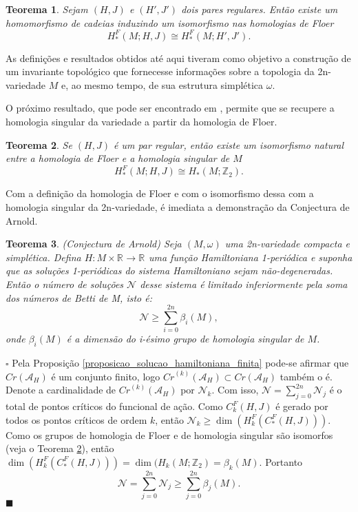 \documentclass[12pt]{book}
\newtheorem{teorema}{Teorema}[section]
\newenvironment{prova}[1]{$\square$ #1}{\hfill$\blacksquare$}
\newcommand{\funcionalH}{\mathcal{A}_{H}}
\newcommand{\inteiros}{\mathbb{Z}}
\newcommand{\pontoscriticos}[1]{\textit{Cr}(#1)}
\newcommand{\pontoscriticosordem}[2]{\textit{Cr}^{(#1)}(#2)}
\newcommand{\real}[1]{\mathbb{R}^{#1}}
\newcommand{\reta}{\real{}}
\begin{document}
	\begin{teorema}
		Sejam $(H,J)$ e $(H',J')$ dois pares regulares. Então existe um homomorfismo de cadeias induzindo um isomorfismo nas homologias de Floer
		$$
		H^{F}_{*}(M;H,J) \cong H^{F}_{*}(M;H',J') . 
		$$
	\end{teorema}
	
	As definições e resultados obtidos até aqui tiveram como objetivo a construção de um invariante topológico que fornecesse informações sobre a topologia da 2n-variedade $M$ e, ao mesmo tempo, de sua estrutura simplética $\omega$.
	
	O próximo resultado, que pode ser encontrado em \cite{salamon_zehnder}, permite que se recupere a homologia singular da variedade a partir da homologia de Floer.
	
	\begin{teorema}\label{teorema_isomorfismo_homologia_floer}
		Se $(H,J)$ é um par regular, então 
		existe um isomorfismo natural entre a homologia de Floer e a homologia singular de $M$
		$$
		H^{F}_{*}(M;H,J) \cong H_{*}(M;\inteiros_{2}). 
		$$
		
	\end{teorema}
	
	Com a definição da homologia de Floer e com o isomorfismo dessa com a homologia singular da 2n-variedade, é imediata a demonstração da Conjectura de Arnold.
	
	\begin{teorema}
			(Conjectura de Arnold) Seja $(M,\omega)$ uma 2n-variedade compacta e simplética. Defina $H:M\times \real{} \to \reta$ uma função Hamiltoniana 1-periódica e suponha que as soluções 1-periódicas do sistema Hamiltoniano sejam não-degeneradas. Então o número de soluções $\mathcal{N}$ desse sistema é limitado inferiormente pela soma dos números de Betti de M, isto é:
				$$
				\mathcal{N}\geq \sum_{i=0}^{2n}\beta_{i}(M),
				$$
				onde $\beta_{i}(M)$ é a dimensão do i-ésimo grupo de homologia singular de $M$.
	\end{teorema}
	\begin{prova}
		Pela Proposição \ref{proposicao_solucao_hamiltoniana_finita} pode-se afirmar que $\pontoscriticos{\funcionalH}$ é um conjunto finito, logo $\pontoscriticosordem{k}{\funcionalH} \subset \pontoscriticos{\funcionalH}$ também o é. Denote a cardinalidade de $\pontoscriticosordem{k}{\funcionalH}$ por $\mathcal{N}_{k}$. Com isso, $\mathcal{N} =\sum_{j=0}^{2n} \mathcal{N}_{j}$ é o total de pontos críticos do funcional de ação. Como $C^{F}_{k}(H,J)$ é gerado por todos os pontos críticos de ordem $k$, então $\mathcal{N}_{k}\geq \dim(	H^{F}_{k}(C^{F}_{*}(H,J)))$. Como os grupos de homologia de Floer e de homologia singular são isomorfos (veja o Teorema \ref{teorema_isomorfismo_homologia_floer}), então $\dim(	H^{F}_{k}(C^{F}_{*}(H,J)))  = \dim(	H_{k}(M;\inteiros_{2}) = \beta_{k}(M)$. Portanto
		$$
		\mathcal{N} =\sum_{j=0}^{2n} \mathcal{N}_{j} \geq \sum_{j=0}^{2n} \beta_{j}(M).
		$$ 
	\end{prova}
	
\end{document}
